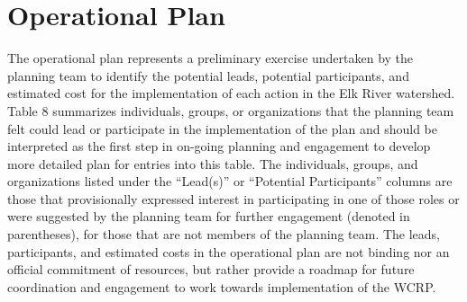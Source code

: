 \documentclass[
  letterpaper,
  DIV=11,
  numbers=noendperiod]{scrreprt}
\begin{document}
\section*{Operational Plan}\label{operational-plan-1}


The operational plan represents a preliminary exercise undertaken by the
planning team to identify the potential leads, potential participants,
and estimated cost for the implementation of each action in the Elk
River watershed. Table 8 summarizes individuals, groups, or
organizations that the planning team felt could lead or participate in
the implementation of the plan and should be interpreted as the first
step in on-going planning and engagement to develop more detailed plan
for entries into this table. The individuals, groups, and organizations
listed under the ``Lead(s)'' or ``Potential Participants'' columns are
those that provisionally expressed interest in participating in one of
those roles or were suggested by the planning team for further
engagement (denoted in parentheses), for those that are not members of
the planning team. The leads, participants, and estimated costs in the
operational plan are not binding nor an official commitment of
resources, but rather provide a roadmap for future coordination and
engagement to work towards implementation of the WCRP.
\end{document}
